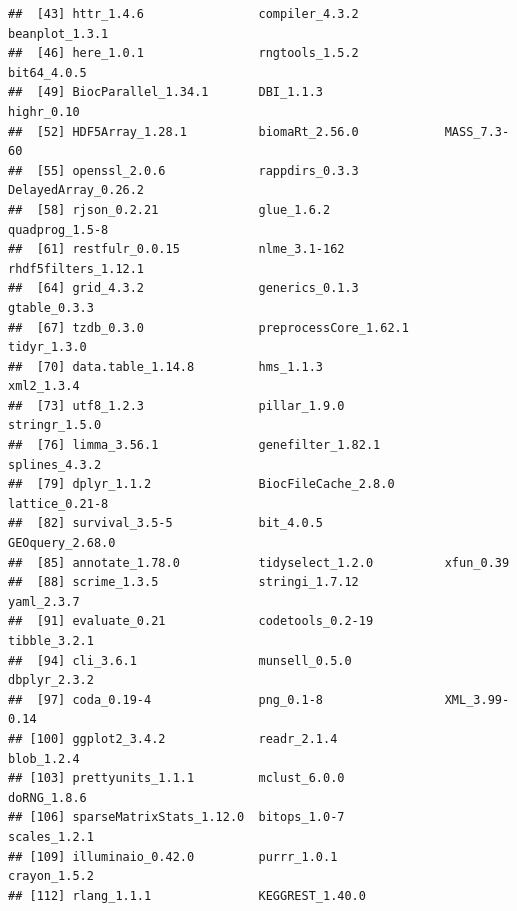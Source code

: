 \documentclass[
  10pt,
]{article}
\begin{document}
\begin{verbatim}
##  [43] httr_1.4.6                compiler_4.3.2            beanplot_1.3.1           
##  [46] here_1.0.1                rngtools_1.5.2            bit64_4.0.5              
##  [49] BiocParallel_1.34.1       DBI_1.1.3                 highr_0.10               
##  [52] HDF5Array_1.28.1          biomaRt_2.56.0            MASS_7.3-60              
##  [55] openssl_2.0.6             rappdirs_0.3.3            DelayedArray_0.26.2      
##  [58] rjson_0.2.21              glue_1.6.2                quadprog_1.5-8           
##  [61] restfulr_0.0.15           nlme_3.1-162              rhdf5filters_1.12.1      
##  [64] grid_4.3.2                generics_0.1.3            gtable_0.3.3             
##  [67] tzdb_0.3.0                preprocessCore_1.62.1     tidyr_1.3.0              
##  [70] data.table_1.14.8         hms_1.1.3                 xml2_1.3.4               
##  [73] utf8_1.2.3                pillar_1.9.0              stringr_1.5.0            
##  [76] limma_3.56.1              genefilter_1.82.1         splines_4.3.2            
##  [79] dplyr_1.1.2               BiocFileCache_2.8.0       lattice_0.21-8           
##  [82] survival_3.5-5            bit_4.0.5                 GEOquery_2.68.0          
##  [85] annotate_1.78.0           tidyselect_1.2.0          xfun_0.39                
##  [88] scrime_1.3.5              stringi_1.7.12            yaml_2.3.7               
##  [91] evaluate_0.21             codetools_0.2-19          tibble_3.2.1             
##  [94] cli_3.6.1                 munsell_0.5.0             dbplyr_2.3.2             
##  [97] coda_0.19-4               png_0.1-8                 XML_3.99-0.14            
## [100] ggplot2_3.4.2             readr_2.1.4               blob_1.2.4               
## [103] prettyunits_1.1.1         mclust_6.0.0              doRNG_1.8.6              
## [106] sparseMatrixStats_1.12.0  bitops_1.0-7              scales_1.2.1             
## [109] illuminaio_0.42.0         purrr_1.0.1               crayon_1.5.2             
## [112] rlang_1.1.1               KEGGREST_1.40.0
\end{verbatim}
\end{document}
